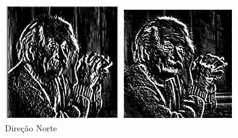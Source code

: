 \documentclass[a4paper, 12pt]{article}
\begin{document}
  \begin{figure}[!htbp]
	\centering
	  	\includegraphics[width=\linewidth]{images/kirsch2.jpg}
	  	\caption{Direção Norte}
	\endminipage\hspace{1cm}
	 	\includegraphics[width=\linewidth]{images/kirsch3.jpg}

\end{figure}
\end{document}
